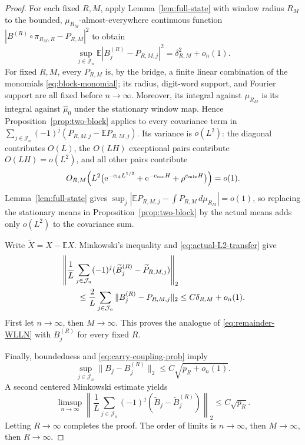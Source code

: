 \documentclass[11pt,a4paper]{amsart}
\theoremstyle{definition}
\theoremstyle{remark}
\newcommand{\E}{\mathbb E}
\newcommand{\e}{\mathrm e}
\begin{document}
\begin{proof}
For each fixed $R,M$, apply Lemma~\ref{lem:full-state} with window radius
$R_M$ to the bounded, $\mu_{R_M}$-almost-everywhere continuous function
$|B^{(R)}\circ\pi_{R_M,R}-P_{R,M}|^2$ to obtain
\begin{equation}\label{eq:actual-L2-transfer}
 \sup_{j\in\mathcal J_n}
 \E|B_j^{(R)}-P_{R,M,j}|^2
 =\delta_{R,M}^2+o_n(1).
\end{equation}
For fixed $R,M$, every $P_{R,M}$ is, by the bridge, a finite linear
combination of the monomials \eqref{eq:block-monomial}; its radius, digit-word
support, and Fourier support are all fixed before $n\to\infty$.  Moreover,
its integral against $\mu_{R_M}$ is its integral against $\widehat\mu_0$ under
the stationary window map.  Hence Proposition~\ref{prop:two-block} applies to
every covariance term in
$\sum_{j\in\mathcal J_n}(-1)^j(P_{R,M,j}-\E P_{R,M,j})$.  Its variance is
$o(L^2)$: the diagonal contributes $O(L)$, the $O(LH)$ exceptional pairs
contribute $O(LH)=o(L^2)$, and all other pairs contribute
\[
 O_{R,M}\!\left(L^2\bigl(\e^{-c_{\rm ld}L^{1/2}}
                  +\e^{-c_{\rm osc}H}+\rho^{c_{\rm mix}H}\bigr)\right)
 =o(1).
\]
Lemma~\ref{lem:full-state} gives
$\sup_j|\E P_{R,M,j}-\int P_{R,M}\,d\mu_{R_M}|=o(1)$, so replacing the
stationary means in Proposition~\ref{prop:two-block} by the actual means adds
only $o(L^2)$ to the covariance sum.

Write $\widetilde X=X-\E X$.  Minkowski's inequality and
\eqref{eq:actual-L2-transfer} give
\begin{align}\label{eq:Minkowski-polynomial}
 &\left\|\frac1L\sum_{j\in\mathcal J_n}(-1)^j
 (\widetilde B_j^{(R)}-\widetilde P_{R,M,j})\right\|_2\\
 &\qquad\le\frac2L\sum_{j\in\mathcal J_n}
 \|B_j^{(R)}-P_{R,M,j}\|_2
 \le C\delta_{R,M}+o_n(1).\notag
\end{align}
First let $n\to\infty$, then $M\to\infty$.  This proves the analogue of
\eqref{eq:remainder-WLLN} with $B_j^{(R)}$ for every fixed $R$.

Finally, boundedness and \eqref{eq:carry-coupling-prob} imply
\[
 \sup_{j\in\mathcal J_n}\|B_j-B_j^{(R)}\|_2
 \le C\sqrt{p_R+o_n(1)}.
\]
A second centered Minkowski estimate yields
\begin{equation}\label{eq:Minkowski-reset}
 \limsup_{n\to\infty}
 \left\|\frac1L\sum_{j\in\mathcal J_n}(-1)^j
 (\widetilde B_j-\widetilde B_j^{(R)})\right\|_2
 \le C\sqrt{p_R}.
\end{equation}
Letting $R\to\infty$ completes the proof.  The order of limits is
$n\to\infty$, then $M\to\infty$, then $R\to\infty$.
\end{proof}
\end{document}
